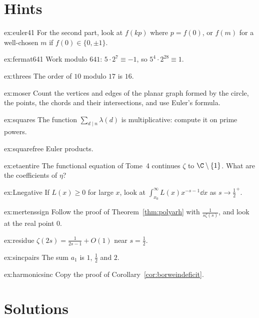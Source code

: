 \section{Hints}

\begin{hint}{ex:euler41}
For the second part, look at $f(kp)$ where $p=f(0)$, or $f(m)$ for a well-chosen $m$ if $f(0)\in\{0,\pm1\}$.
\end{hint}
\begin{hint}{ex:fermat641}
Work modulo $641$: $5\cdot2^7\equiv-1$, so $5^4\cdot2^{28}\equiv1$.
\end{hint}
\begin{hint}{ex:threes}
The order of $10$ modulo $17$ is $16$.
\end{hint}
\begin{hint}{ex:moser}
Count the vertices and edges of the planar graph formed by the circle, the points, the chords and their intersections, and use Euler's formula.
\end{hint}
\begin{hint}{ex:squares}
The function $\sum_{d\mid n}\lambda(d)$ is multiplicative: compute it on prime powers.
\end{hint}
\begin{hint}{ex:squarefree}
Euler products.
\end{hint}
\begin{hint}{ex:etaentire}
The functional equation of Tome~4 continues $\zeta$ to $\C\setminus\{1\}$. What are the coefficients of $\eta$?
\end{hint}
\begin{hint}{ex:Lnegative}
If $L(x)\ge0$ for large $x$, look at $\int_{x_0}^\infty L(x)x^{-s-1}\dd x$ as $s\to\frac12^+$.
\end{hint}
\begin{hint}{ex:mertenssign}
Follow the proof of Theorem~\ref{thm:polyarh} with $\frac1{s\zeta(s)}$, and look at the real point $0$.
\end{hint}
\begin{hint}{ex:residue}
$\zeta(2s)=\frac1{2s-1}+O(1)$ near $s=\frac12$.
\end{hint}
\begin{hint}{ex:sincpairs}
The sum $a_1$ is $1$, $\frac12$ and $2$.
\end{hint}
\begin{hint}{ex:harmonicsinc}
Copy the proof of Corollary~\ref{cor:borweindeficit}.
\end{hint}

\section{Solutions}

